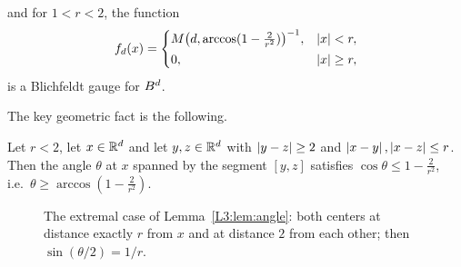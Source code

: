 \begin{theorem}\label{L3:thm:KLgauge}
 and for $1<r<2$, the function
\[
  f_d(x)=\begin{cases} M\bigl(d,\arccos(1-\tfrac{2}{r^2})\bigr)^{-1}, & \left\lvert x \right\rvert<r,\\[2pt] 0, & \left\lvert x \right\rvert\ge r,\end{cases}
\]
is a Blichfeldt gauge for $B^d$.
\end{theorem}

The key geometric fact is the following.

\begin{lemma}\label{L3:lem:angle}
Let $r<2$, let $x\in\mathbb{R}^d$ and let $y,z\in\mathbb{R}^d$ with $\left\lvert y-z \right\rvert\ge 2$ and $\left\lvert x-y \right\rvert,\left\lvert x-z \right\rvert\le r$. Then the angle $\theta$ at $x$
spanned by the segment $[y,z]$ satisfies $\cos\theta\le 1-\frac{2}{r^2}$, i.e.\ $\theta\ge\arccos(1-\frac2{r^2})$.
\end{lemma}

\begin{figure}[ht]
\centering
{}
\caption{The extremal case of Lemma~\ref{L3:lem:angle}: both centers at distance exactly $r$ from $x$ and at distance $2$ from each
other; then $\sin(\theta/2)=1/r$.}
\label{L3:fig:angle}
\end{figure}

